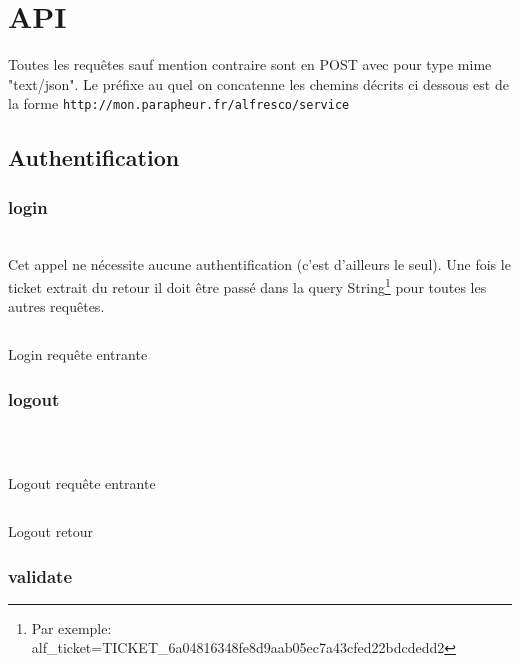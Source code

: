 \section{API}

Toutes les requêtes sauf mention contraire sont en POST avec pour type mime "text/json". Le préfixe au quel on concatenne les chemins décrits ci dessous est de la forme \verb|http://mon.parapheur.fr/alfresco/service|

\subsection{Authentification}

\subsubsection{login}
\\

Cet appel ne nécessite aucune authentification (c'est d'ailleurs le seul). Une fois le ticket extrait du retour il doit être passé dans la query String\footnote{Par exemple: alf\_ticket=TICKET\_6a04816348fe8d9aab05ec7a43cfed22bdcdedd2} pour toutes les autres requêtes.

\begin{codesnippet}
\inputminted[frame=single,linenos,fontsize=\footnotesize]{javascript}{extraits/login_in.js}
\caption{Login requête entrante}
\label{snip:login_in}
\end{codesnippet}


\subsubsection{logout}
\\

\begin{codesnippet}
\inputminted[frame=single,linenos,fontsize=\footnotesize]{javascript}{extraits/logout_in.js}
\caption{Logout requête entrante}
\label{snip:logout_in}
\end{codesnippet}

\begin{codesnippet}
\inputminted[frame=single,linenos,fontsize=\footnotesize]{javascript}{extraits/logout_out.js}
\caption{Logout retour}
\label{snip:logout_out}
\end{codesnippet}


\subsubsection{validate}

